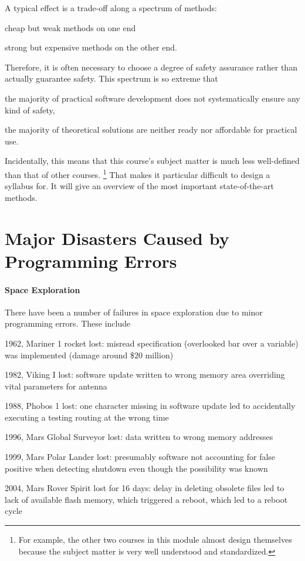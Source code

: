 A typical effect is a trade-off along a spectrum of methods:
\begin{compactitem}
 \item cheap but weak methods on one end
 \item strong but expensive methods on the other end.
\end{compactitem}
Therefore, it is often necessary to choose a degree of safety assurance rather than actually guarantee safety.
This spectrum is so extreme that
\begin{compactitem}
 \item the majority of practical software development does not systematically ensure any kind of safety,
 \item the majority of theoretical solutions are neither ready nor affordable for practical use.
\end{compactitem}

Incidentally, this means that this course's subject matter is much less well-defined than that of other courses.%
\footnote{For example, the other two courses in this module almost design themselves because the subject matter is very well understood and standardized.}
That makes it particular difficult to design a syllabus for.
It will give an overview of the most important state-of-the-art methods.

\section{Major Disasters Caused by Programming Errors}

\paragraph{Space Exploration}
There have been a number of failures in space exploration due to minor programming errors.
These include
\begin{compactitem}
 \item 1962, Mariner 1 rocket lost: misread specification (overlooked bar over a variable) was implemented (damage around \$$20$ million)
 \item 1982, Viking I lost: software update written to wrong memory area overriding vital parameters for antenna
 \item 1988, Phobos 1 lost: one character missing in software update led to accidentally executing a testing routing at the wrong time
 \item 1996, Mars Global Surveyor lost: data written to wrong memory addresses
 \item 1999, Mars Polar Lander lost: presumably software not accounting for false positive when detecting shutdown even though the possibility was known
 \item 2004, Mars Rover Spirit lost for 16 days: delay in deleting obsolete files led to lack of available flash memory, which triggered a reboot, which led to a reboot cycle
\end{compactitem}

